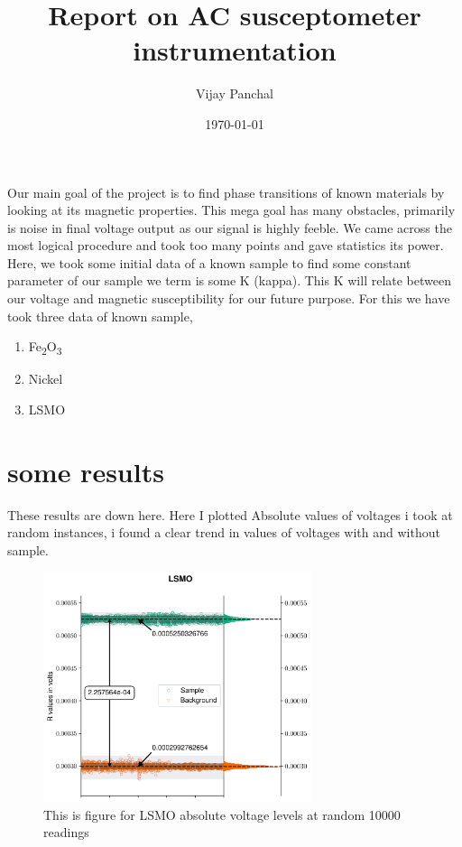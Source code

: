\documentclass[a4paper,11pt]{article}
\author{Vijay Panchal}
\date{\today}
\title{Report on AC susceptometer instrumentation}
\begin{document}
\maketitle
Our main goal of the project is to find phase transitions of known materials by looking at its magnetic properties. This mega goal has many obstacles, primarily is noise in final voltage output as our signal is highly feeble. We came across the most logical procedure and took too many points and gave statistics its power. Here, we took some initial data of a known sample to find some constant parameter of our sample we term is some K (kappa). This K will relate between our voltage and magnetic susceptibility for our future purpose. For this we have took three data of known sample,

\begin{enumerate}
\item Fe\textsubscript{2}O\textsubscript{3}
\item Nickel
\item LSMO
\end{enumerate}

\section{some results}
\label{sec:org6b612a1}
These results are down here. Here I plotted Absolute values of voltages i took at random instances, i found a clear trend in values of voltages with and without sample. 

\begin{figure}[!ht]\center
\includegraphics[width=0.7\textwidth]{LSMOR.png}
\caption{This is figure for LSMO absolute voltage levels at random 10000 readings}
\end{figure}
\end{document}
